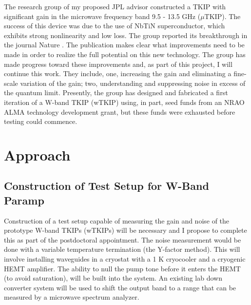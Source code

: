 The research group of my proposed JPL advisor constructed a TKIP with significant gain in the microwave frequency band 9.5 - 13.5 GHz ($\mu$TKIP). The success of this  device was due to the use of  NbTiN superconductor, which exhibits strong nonlinearity and low loss. The group reported its breakthrough in the journal Nature \cite{Eom2012}. The publication makes clear what improvements need to be made in order to realize the full potential on this new technology. The group has made progress toward these improvements and, as part of this project, I will continue this work. They include, one, increasing the  gain and eliminating a fine-scale variation of the gain; two, understanding and suppressing noise in excess of the quantum limit. Presently, the group has designed and fabricated a first iteration of a W-band TKIP (wTKIP) using, in part, seed funds from an NRAO ALMA technology development grant, but these funds were exhausted before testing could commence. 


%
%
%


\section*{Approach}
\subsection*{Construction of Test Setup for W-Band Paramp}
Construction of a test setup capable of measuring the gain and noise of the prototype W-band TKIPs (wTKIPs) will be necessary and I propose to complete this as part of the postdoctoral appointment. The noise measurement would be done with a variable temperature termination (the Y-factor method). This will involve installing waveguides in a cryostat with a 1 K cryocooler and a cryogenic HEMT amplifier. The ability to null the pump tone before it enters the HEMT (to avoid saturation), will be built into the system. An existing lab down converter system will be used to shift the output band to a range that can be measured by a microwave spectrum analyzer.


